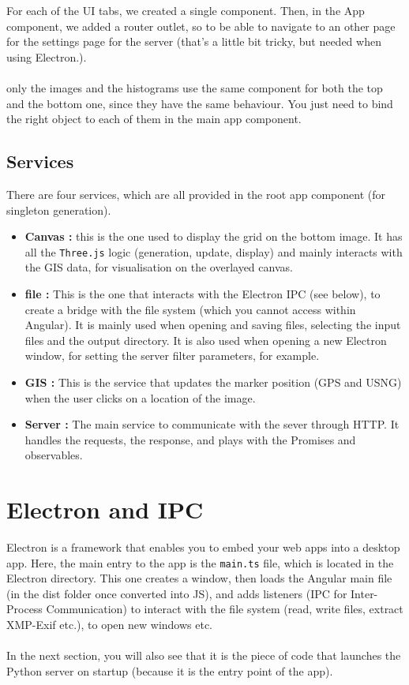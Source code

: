 \documentclass[12pt,a4paper]{article}
\begin{document}
For each of the UI tabs, we created a single component. Then, in the App component, we added a router outlet, so to be able to navigate to an other page for the settings page for the server (that's a little bit tricky, but needed when using Electron.).\\
~\\
only the images and the histograms use the same component for both the top and the bottom one, since they have the same behaviour. You just need to bind the right object to each of them in the main app component.

\subsection{Services}

There are four services, which are all provided in the root app component (for singleton generation).

\begin{itemize}
	\item \textbf{Canvas :} this is the one used to display the grid on the bottom image. It has all the \texttt{Three.js} logic (generation, update, display) and mainly interacts with the GIS data, for visualisation on the overlayed canvas.
	\item \textbf{file :} This is the one that interacts with the Electron IPC (see below), to create a bridge with the file system (which you cannot access within Angular). It is mainly used when opening and saving files, selecting the input files and the output directory. It is also used when opening a new Electron window, for setting the server filter parameters, for example.
	\item \textbf{GIS :} This is the service that updates the marker position (GPS and USNG) when the user clicks on a location of the image.
	\item \textbf{Server :} The main service to communicate with the sever through HTTP. It handles the requests, the response, and plays with the Promises and observables.
\end{itemize}

\section{Electron and IPC}

Electron is a framework that enables you to embed your web apps into a desktop app. Here, the main entry to the app is the \texttt{main.ts} file, which is located in the Electron directory. This one creates a window, then loads the Angular main file (in the dist folder once converted into JS), and adds listeners (IPC for Inter-Process Communication) to interact with the file system (read, write files, extract XMP-Exif etc.), to open new windows etc.\\
~\\
In the next section, you will also see that it is the piece of code that launches the Python server on startup (because it is the entry point of the app).
\end{document}

